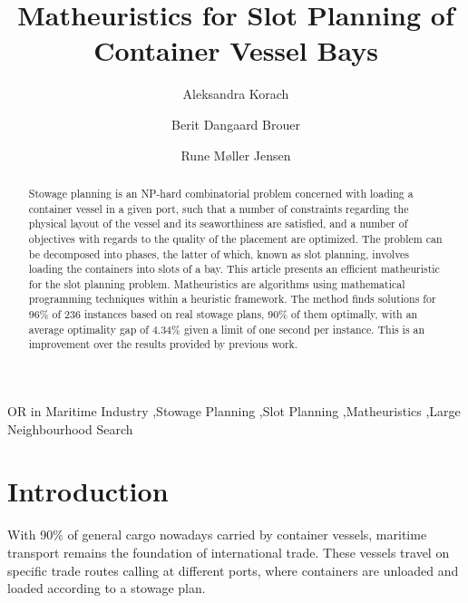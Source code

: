 \documentclass[preprint,11pt,3p]{elsarticle}
\begin{document}
\begin{frontmatter}

\title{Matheuristics for Slot Planning of Container Vessel Bays}


\author[itu]{Aleksandra Korach}

\author[op]{Berit Dangaard Brouer}

\author[itu]{Rune M{\o}ller Jensen}

\address[itu]{IT University of Copenhagen, Rued Langgaards Vej 7, 2300 Copenhagen S, Denmark}

\address[op]{Optivation, Njalsgade 76, 2300 Copenhagen S, Denmark}



\begin{abstract}
Stowage planning is an NP-hard combinatorial problem concerned with loading a container vessel in a given port, such that a number of constraints regarding the physical layout of the vessel and its seaworthiness are satisfied, and a number of objectives with regards to the quality of the placement are optimized. The problem can be decomposed into phases, the latter of which, known as slot planning, involves loading the containers into slots of a bay. This article presents an efficient matheuristic for the slot planning problem. Matheuristics are algorithms using mathematical programming techniques within a heuristic framework. The method finds solutions for 96\% of 236 instances based on real stowage plans, 90\% of them optimally, with an average optimality gap of 4.34\% given a limit of one second per instance. This is an improvement over the results provided by previous work.
\end{abstract}

\begin{keyword}
OR in Maritime Industry \sep Stowage Planning \sep Slot Planning \sep Matheuristics \sep Large Neighbourhood Search 
\end{keyword}

\end{frontmatter}


\section{Introduction}
\label{sec:Introduction}
With 90\% of general cargo nowadays carried by container vessels, maritime transport remains the foundation of international trade. These vessels travel on specific trade routes calling at different ports, where containers are unloaded and loaded according to a stowage plan. 
\end{document}
